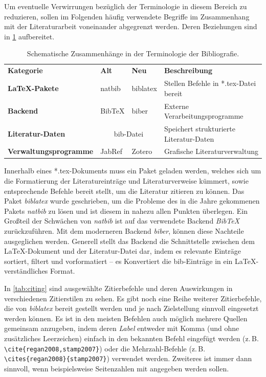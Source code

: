 	Um eventuelle Verwirrungen bezüglich der Terminologie in diesem Bereich zu reduzieren, sollen im Folgenden häufig verwendete Begriffe im Zusammenhang mit der Literaturarbeit voneinander abgegrenzt werden.
	Deren Beziehungen sind in \cref{tab:bibliography} aufbereitet.

	\begin{table}[!htb]
		\centering
		\caption{Schematische Zusammenhänge in der Terminologie der Bibliografie.}
		\label{tab:bibliography}
		\begin{tabular}{llll}
			\toprule
			\textbf{Kategorie} & \textbf{Alt} & \textbf{Neu} & \textbf{Beschreibung} \\
			\cmidrule(r){1-1}
			\cmidrule(lr){2-3}
			\cmidrule(l){4-4}
			\textbf{LaTeX-Pakete} & natbib & biblatex & Stellen Befehle in *.tex-Datei bereit \\
			\textbf{Backend} & BibTeX & biber & Externe Verarbeitungsprogramme \\
			\textbf{Literatur-Daten} & \multicolumn{2}{c}{bib-Datei} & Speichert strukturierte Literatur-Daten \\
			\textbf{Verwaltungsprogramme} & JabRef & Zotero & Grafische Literaturverwaltung \\
			\bottomrule
		\end{tabular}		
	\end{table}
	
	Innerhalb eines *.tex-Dokuments muss ein Paket geladen werden, welches sich um die Formatierung der Literatureinträge und Literaturverweise kümmert, sowie entsprechende Befehle bereit stellt, um die Literatur zitieren zu können.
	Das Paket \textit{biblatex} wurde geschrieben, um die Probleme des in die Jahre gekommenen Pakets \textit{natbib} zu lösen und ist diesem in nahezu allen Punkten überlegen.
	Ein Großteil der Schwächen von \textit{natbib} ist auf das verwendete Backend \textit{BibTeX} zurückzuführen.
	Mit dem moderneren Backend \textit{biber}, können diese Nachteile ausgeglichen werden.
	Generell stellt das Backend die Schnittstelle zwischen dem LaTeX-Dokument und der Literatur-Datei dar, indem es relevante Einträge sortiert, filtert und vorformatiert -- es Konvertiert die bib-Einträge in ein LaTeX-verständliches Format.
	
	In \cref{tab:citing} sind ausgewählte Zitierbefehle und deren Auswirkungen in verschiedenen Zitierstilen zu sehen.
	Es gibt noch eine Reihe weiterer Zitierbefehle, die von \textit{biblatex} bereit gestellt werden und je nach Zielstellung sinnvoll eingesetzt werden können.
	Es ist in den meisten Befehlen auch möglich mehrere Quellen gemeinsam anzugeben, indem deren \textit{Label} entweder mit Komma (und ohne zusätzliches Leerzeichen) einfach in den bekannten Befehl eingefügt werden (z.\,B. \verb|\cite{regan2008,stamp2007}|) oder die Mehrzahl-Befehle (z.\,B. \verb|\cites{regan2008}{stamp2007}|) verwendet werden.
	Zweiteres ist immer dann sinnvoll, wenn beispielsweise Seitenzahlen mit angegeben werden sollen.
		
